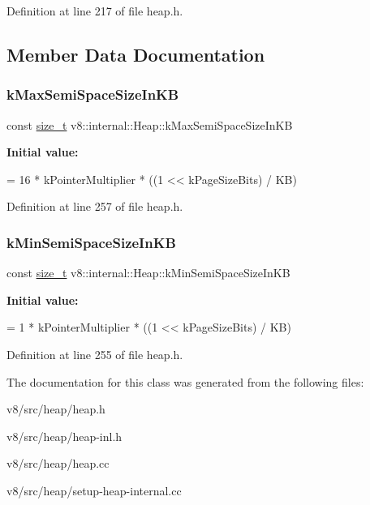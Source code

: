 Definition at line 217 of file heap.\+h.



\subsection{Member Data Documentation}
\mbox{\label{classv8_1_1internal_1_1Heap_a636f891f0f67e1147cfd5778f13cd310}} 
\subsubsection{\texorpdfstring{k\+Max\+Semi\+Space\+Size\+In\+KB}{kMaxSemiSpaceSizeInKB}}
{\footnotesize\ttfamily const \mbox{\hyperlink{classsize__t}{size\+\_\+t}} v8\+::internal\+::\+Heap\+::k\+Max\+Semi\+Space\+Size\+In\+KB\hspace{0.3cm}{\ttfamily [static]}}

{\bfseries Initial value\+:}
\begin{DoxyCode}
=
      16 * kPointerMultiplier * ((1 << kPageSizeBits) / KB)
\end{DoxyCode}


Definition at line 257 of file heap.\+h.

\mbox{\label{classv8_1_1internal_1_1Heap_ae9c3c05a632f4c7934343ac51fb51642}} 
\subsubsection{\texorpdfstring{k\+Min\+Semi\+Space\+Size\+In\+KB}{kMinSemiSpaceSizeInKB}}
{\footnotesize\ttfamily const \mbox{\hyperlink{classsize__t}{size\+\_\+t}} v8\+::internal\+::\+Heap\+::k\+Min\+Semi\+Space\+Size\+In\+KB\hspace{0.3cm}{\ttfamily [static]}}

{\bfseries Initial value\+:}
\begin{DoxyCode}
=
      1 * kPointerMultiplier * ((1 << kPageSizeBits) / KB)
\end{DoxyCode}


Definition at line 255 of file heap.\+h.



The documentation for this class was generated from the following files\+:\begin{DoxyCompactItemize}
\item 
v8/src/heap/heap.\+h\item 
v8/src/heap/heap-\/inl.\+h\item 
v8/src/heap/heap.\+cc\item 
v8/src/heap/setup-\/heap-\/internal.\+cc\end{DoxyCompactItemize}
